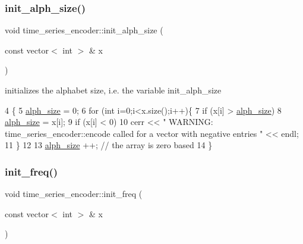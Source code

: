 \subsubsection{\texorpdfstring{init\+\_\+alph\+\_\+size()}{init\_alph\_size()}}
{\footnotesize\ttfamily void time\+\_\+series\+\_\+encoder\+::init\+\_\+alph\+\_\+size (\begin{DoxyParamCaption}\item[{const vector$<$ int $>$ \&}]{x }\end{DoxyParamCaption})\hspace{0.3cm}{\ttfamily [private]}}



initializes the alphabet size, i.\+e. the variable init\+\_\+alph\+\_\+size 


\begin{DoxyCode}
4 \{
5   \hyperlink{classtime__series__encoder_a7e73867e25ea5ae643bf05eaf33ea9ac}{alph\_size} = 0;
6   \textcolor{keywordflow}{for} (\textcolor{keywordtype}{int} i=0;i<x.size();i++)\{
7     \textcolor{keywordflow}{if} (x[i] > \hyperlink{classtime__series__encoder_a7e73867e25ea5ae643bf05eaf33ea9ac}{alph\_size})
8       \hyperlink{classtime__series__encoder_a7e73867e25ea5ae643bf05eaf33ea9ac}{alph\_size} = x[i];
9     \textcolor{keywordflow}{if} (x[i] < 0)
10       cerr << \textcolor{stringliteral}{" WARNING: time\_series\_encoder::encode called for a vector with negative entries "} << endl;
11   \}
12 
13   \hyperlink{classtime__series__encoder_a7e73867e25ea5ae643bf05eaf33ea9ac}{alph\_size} ++; \textcolor{comment}{// the array is zero based }
14 \}
\end{DoxyCode}
\mbox{\label{classtime__series__encoder_af4b8988acb10fe076be59302e47084be}} 
\subsubsection{\texorpdfstring{init\+\_\+freq()}{init\_freq()}}
{\footnotesize\ttfamily void time\+\_\+series\+\_\+encoder\+::init\+\_\+freq (\begin{DoxyParamCaption}\item[{const vector$<$ int $>$ \&}]{x }\end{DoxyParamCaption})\hspace{0.3cm}{\ttfamily [private]}}



